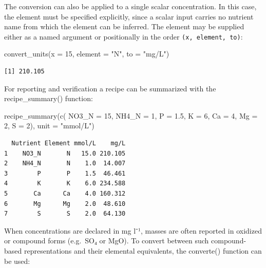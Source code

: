 \documentclass[
  letterpaper,
  DIV=11,
  numbers=noendperiod]{scrreprt}
\newenvironment{Shaded}{\begin{snugshade}}{\end{snugshade}}
\newcommand{\AttributeTok}[1]{\textcolor[rgb]{0.40,0.45,0.13}{#1}}
\newcommand{\DecValTok}[1]{\textcolor[rgb]{0.68,0.00,0.00}{#1}}
\newcommand{\FloatTok}[1]{\textcolor[rgb]{0.68,0.00,0.00}{#1}}
\newcommand{\FunctionTok}[1]{\textcolor[rgb]{0.28,0.35,0.67}{#1}}
\newcommand{\NormalTok}[1]{\textcolor[rgb]{0.00,0.23,0.31}{#1}}
\newcommand{\StringTok}[1]{\textcolor[rgb]{0.13,0.47,0.30}{#1}}
\begin{document}
The conversion can also be applied to a single scalar concentration. In
this case, the element must be specified explicitly, since a scalar
input carries no nutrient name from which the element can be inferred.
The element may be supplied either as a named argument or positionally
in the order \texttt{(x,\ element,\ to)}:

\begin{Shaded}
\begin{Highlighting}[]
\FunctionTok{convert\_units}\NormalTok{(}\AttributeTok{x =} \DecValTok{15}\NormalTok{, }\AttributeTok{element =} \StringTok{"N"}\NormalTok{, }\AttributeTok{to =} \StringTok{"mg/L"}\NormalTok{)}
\end{Highlighting}
\end{Shaded}

\begin{verbatim}
[1] 210.105
\end{verbatim}

For reporting and verification a recipe can be summarized with the
recipe\_summary() function:

\begin{Shaded}
\begin{Highlighting}[]
\FunctionTok{recipe\_summary}\NormalTok{(}\FunctionTok{c}\NormalTok{(}
    \AttributeTok{NO3\_N =} \DecValTok{15}\NormalTok{,}
    \AttributeTok{NH4\_N =} \DecValTok{1}\NormalTok{,}
    \AttributeTok{P     =} \FloatTok{1.5}\NormalTok{,}
    \AttributeTok{K     =} \DecValTok{6}\NormalTok{,}
    \AttributeTok{Ca    =} \DecValTok{4}\NormalTok{,}
    \AttributeTok{Mg    =} \DecValTok{2}\NormalTok{,}
    \AttributeTok{S     =} \DecValTok{2}\NormalTok{),}
  \AttributeTok{unit =} \StringTok{"mmol/L"}\NormalTok{)}
\end{Highlighting}
\end{Shaded}

\begin{verbatim}
  Nutrient Element mmol/L    mg/L
1    NO3_N       N   15.0 210.105
2    NH4_N       N    1.0  14.007
3        P       P    1.5  46.461
4        K       K    6.0 234.588
5       Ca      Ca    4.0 160.312
6       Mg      Mg    2.0  48.610
7        S       S    2.0  64.130
\end{verbatim}

When concentrations are declared in mg l⁻¹, masses are often reported in
oxidized or compound forms (e.g.~SO₄ or MgO). To convert between such
compound-based representations and their elemental equivalents, the
converte() function can be used:
\end{document}

